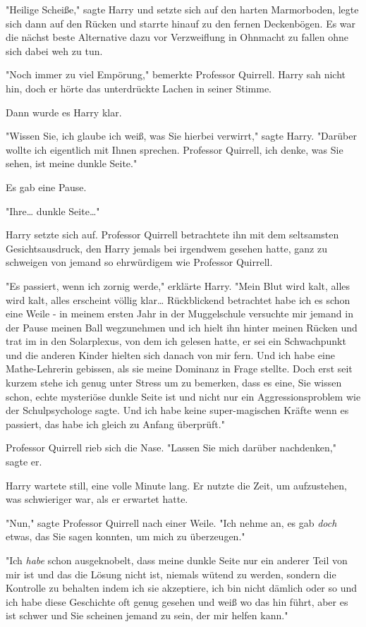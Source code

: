 {"Heilige Scheiße," sagte Harry und setzte sich auf den harten Marmorboden, legte sich dann auf den Rücken und starrte hinauf zu den fernen Deckenbögen. Es war die nächst beste Alternative dazu vor Verzweiflung in Ohnmacht zu fallen ohne sich dabei weh zu tun.

"Noch immer zu viel Empörung," bemerkte Professor Quirrell. Harry sah nicht hin, doch er hörte das unterdrückte Lachen in seiner Stimme.

Dann wurde es Harry klar.

"Wissen Sie, ich glaube ich weiß, was Sie hierbei verwirrt," sagte Harry. "Darüber wollte ich eigentlich mit Ihnen sprechen. Professor Quirrell, ich denke, was Sie sehen, ist meine dunkle Seite."

Es gab eine Pause.

"Ihre… dunkle Seite…"

Harry setzte sich auf. Professor Quirrell betrachtete ihn mit dem seltsamsten Gesichtsausdruck, den Harry jemals bei irgendwem gesehen hatte, ganz zu schweigen von jemand so ehrwürdigem wie Professor Quirrell.

"Es passiert, wenn ich zornig werde," erklärte Harry. "Mein Blut wird kalt, alles wird kalt, alles erscheint völlig klar… Rückblickend betrachtet habe ich es schon eine Weile - in meinem ersten Jahr in der Muggelschule versuchte mir jemand in der Pause meinen Ball wegzunehmen und ich hielt ihn hinter meinen Rücken und trat im in den Solarplexus, von dem ich gelesen hatte, er sei ein Schwachpunkt und die anderen Kinder hielten sich danach von mir fern. Und ich habe eine Mathe-Lehrerin gebissen, als sie meine Dominanz in Frage stellte. Doch erst seit kurzem stehe ich genug unter Stress um zu bemerken, dass es eine, Sie wissen schon, echte mysteriöse dunkle Seite ist und nicht nur ein Aggressionsproblem wie der Schulpsychologe sagte. Und ich habe keine super-magischen Kräfte wenn es passiert, das habe ich gleich zu Anfang überprüft."

Professor Quirrell rieb sich die Nase. "Lassen Sie mich darüber nachdenken," sagte er.

Harry wartete still, eine volle Minute lang. Er nutzte die Zeit, um aufzustehen, was schwieriger war, als er erwartet hatte.

"Nun," sagte Professor Quirrell nach einer Weile. "Ich nehme an, es gab \emph{doch} etwas, das Sie sagen konnten, um mich zu überzeugen."

"Ich \emph{habe} schon ausgeknobelt, dass meine dunkle Seite nur ein anderer Teil von mir ist und das die Lösung nicht ist, niemals wütend zu werden, sondern die Kontrolle zu behalten indem ich sie akzeptiere, ich bin nicht dämlich oder so und ich habe diese Geschichte oft genug gesehen und weiß wo das hin führt, aber es ist schwer und Sie scheinen jemand zu sein, der mir helfen kann."

}
